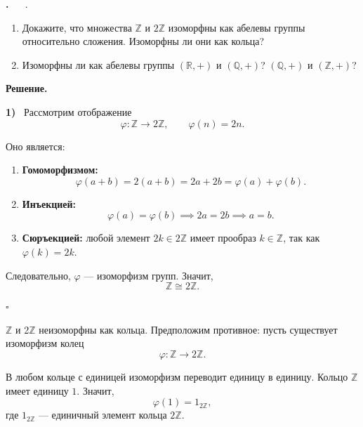 \documentclass[12pt,a4paper]{article}
\date{}                             %
\newcounter{task}                   %
\newenvironment{task}[1][]{%
  \refstepcounter{task}%
  \par\vspace{0.3\baselineskip}%
  \noindent\textbf{\thetask.}%
  \if\relax\detokenize{#1}\relax   %
    \ \ignorespaces                 %
  \else
    \ \textbf{#1}.\ \ignorespaces   %
  \fi
}{%
  \par\vspace{0.2\baselineskip}%
}
\newcommand{\sol}{%
  \par\vspace{0.3\baselineskip}%
  \noindent\textbf{Решение.}\ %
  \ignorespaces                     %
}
\newcommand{\soli}[1]{%
  \par\vspace{0.15\baselineskip}%
  \noindent\textbf{#1)}\ %
  \ignorespaces                     %
}
\newcommand{\sheetnumber}[1]{\def\sheetnumber{#1}}
\newcommand{\studentname}[1]{\def\studentname{#1}}
\newcommand{\assignmenttitle}[1]{\def\assignmenttitle{#1}}
\begin{document}
\sheetnumber{1}                     %
\studentname{Амехин Илья}           %
\assignmenttitle{Алгебраические структуры и кольца вычетов} %
\maketitle


\begin{task}
    \begin{enumerate}
    	\item Докажите, что множества $\mathbb{Z}$ и $2\mathbb{Z}$ изоморфны как абелевы группы относительно сложения. Изоморфны ли они как кольца?
	\item Изоморфны ли как абелевы группы $(\mathbb{R}, +)$ и $(\mathbb{Q}, +)$? $(\mathbb{Q}, +)$ и $(\mathbb{Z}, +)$?
    \end{enumerate}
\end{task}

\sol
\soli{1} Рассмотрим отображение
\[
\varphi: \mathbb{Z} \to 2\mathbb{Z}, \qquad \varphi(n) = 2n.
\]

Оно является:
\begin{enumerate}
    \item \textbf{Гомоморфизмом:} 
    \[
    \varphi(a+b)=2(a+b)=2a+2b=\varphi(a)+\varphi(b).
    \]
    \item \textbf{Инъекцией:} 
    \[
    \varphi(a)=\varphi(b) \implies 2a=2b \implies a=b.
    \]
    \item \textbf{Сюръекцией:} любой элемент $2k \in 2\mathbb{Z}$ имеет прообраз $k \in \mathbb{Z}$, так как $\varphi(k)=2k$.
\end{enumerate}

Следовательно, $\varphi$ — изоморфизм групп. Значит,
\[
\mathbb{Z} \cong 2\mathbb{Z}.
\]

\hfill $\square$

$\mathbb{Z}$ и 2$\mathbb{Z}$ неизоморфны как кольца. Предположим противное: пусть существует изоморфизм колец
\[
\varphi: \mathbb{Z} \to 2\mathbb{Z}.
\]

В любом кольце с единицей изоморфизм переводит единицу в единицу. Кольцо $\mathbb{Z}$ имеет единицу $1$. Значит,
\[
\varphi(1) = 1_{2\mathbb{Z}},
\]
где $1_{2\mathbb{Z}}$ — единичный элемент кольца $2\mathbb{Z}$.
\end{document}

